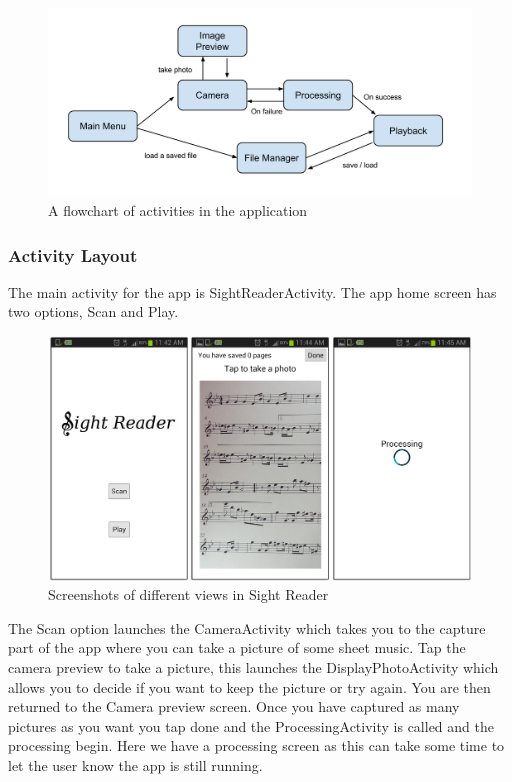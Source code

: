             \begin{figure}[ht!]
                \centering
                \includegraphics[width=150mm]{./assets/activitiesdiag.png}
                \caption{A flowchart of activities in the application}
                \label{image:activitydiag}
            \end{figure}

\subsubsection{Activity Layout}

The main activity for the app is SightReaderActivity. The app home screen has two options, Scan and Play.

 \begin{figure}[ht!]
                \centering
                \includegraphics[width=150mm]{./assets/activities.png}
                \caption{Screenshots of different views in Sight Reader}
                \label{image:activities}
            \end{figure}

The Scan option launches the CameraActivity which takes you to the capture part of the app where you can take a picture of some sheet music. Tap the camera preview to take a picture, this launches the DisplayPhotoActivity which allows you to decide if you want to keep the picture or try again. You are then returned to the Camera preview screen. Once you have captured as many pictures as you want you tap done and the ProcessingActivity is called and the processing begin. Here we have a processing screen as this can take some time to let the user know the app is still running.

